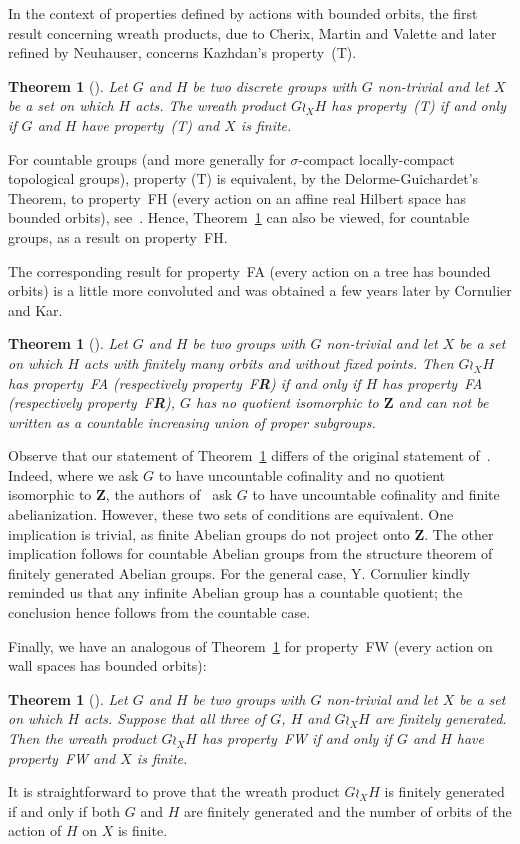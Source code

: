\documentclass[a4paper]{article}
\newtheorem{thm}[lem]{Theorem}
\theoremstyle{definition}
\newcommand*{\field}[1]{\mathbf{#1}}
\newcommand*{\Z}{\field{Z}}
\newcommand*{\FH}{FH}
\newcommand*{\FW}{FW}
\newcommand*{\FA}{FA}
\newcommand*{\FR}{F\textbf{R}}
\begin{document}
In the context of properties defined by actions with bounded orbits, the first result concerning wreath products, due to Cherix, Martin and Valette and later refined by Neuhauser, concerns Kazhdan's property~(T).
%
%
\begin{thm}[\cite{MR2106770,MR2176470}] \label{T:Wreath_prop_T}
Let $G$ and $H$ be two discrete groups with $G$ non-trivial and let $X$ be a set on which $H$ acts.
The wreath product $G \wr_X H$ has property~(T) if and only if $G$ and $H$ have property~(T) and $X$ is finite.
\end{thm}
%
%
For countable groups (and more generally for $\sigma$-compact locally-compact topological groups), property (T) is equivalent, by the Delorme-Guichardet's Theorem, to property~\FH{} (every action on an affine real Hilbert space has bounded orbits), see~\cite[Thm. 2.12.4]{MR2415834}.
Hence, Theorem~\ref{T:Wreath_prop_T} can also be viewed, for countable groups, as a result on property~\FH.

The corresponding result for property~\FA{} (every action on a tree has bounded orbits) is a little more convoluted and was obtained a few years later by Cornulier and Kar.
%
%
\begin{thm}[\cite{MR2764930}]\label{Thm:FACK}
Let $G$ and $H$ be two groups with $G$ non-trivial and let $X$ be a set on which $H$ acts with finitely many orbits and without fixed points.
Then $G\wr_XH$ has property~\FA{} (respectively property~\FR) if and only if $H$ has property~\FA{} (respectively property~\FR), $G$ has no quotient isomorphic to $\Z$ and can not be written as a countable increasing union of proper subgroups.
\end{thm}
%
%
Observe that our statement of Theorem~\ref{Thm:FACK} differs of the original statement of~\cite{MR2764930}.
Indeed, where we ask $G$ to have uncountable cofinality and no quotient isomorphic to $\Z$, the authors of~\cite{MR2764930} ask $G$ to have uncountable cofinality and finite abelianization.
However, these two sets of conditions are equivalent.
One implication is trivial, as finite Abelian groups do not project onto $\Z$. The other implication follows for countable Abelian groups from the structure theorem of finitely generated Abelian groups.
For the general case, Y. Cornulier kindly reminded us that any infinite Abelian group has a countable quotient; the conclusion hence follows from the countable case.

Finally, we have an analogous of Theorem~\ref{T:Wreath_prop_T} for property~\FW{} (every action on wall spaces has bounded orbits):
%
%
\begin{thm}[\cite{Cornulier2013,LS2020}]\label{Thm:PropFW}
Let $G$ and $H$ be two groups with $G$ non-trivial and let $X$ be a set on which $H$ acts.
Suppose that all three of $G$, $H$ and $G\wr_XH$ are finitely generated. Then the wreath product $G \wr_X H$ has property~\FW{} if and only if $G$ and $H$ have property~\FW{} and $X$ is finite.
\end{thm}
%
%
It is straightforward to prove that the wreath product $G \wr_X H$ is finitely generated if and only if both $G$ and $H$ are finitely generated and the number of orbits of the action of $H$ on $X$ is finite.
\end{document}

